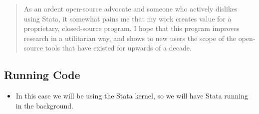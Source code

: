 \documentclass[10pt,parskip=half,
	toc=sectionentrywithdots,
	bibliography=totocnumbered,
	captions=tableheading,numbers=noendperiod]{scrartcl}
\providecommand{\tightlist}{%
  \setlength{\itemsep}{0pt}\setlength{\parskip}{0pt}}
\begin{document}
\begin{quote}
As an ardent open-source advocate and someone who actively dislikes
using Stata, it somewhat pains me that my work creates value for a
proprietary, closed-source program. I hope that this program improves
research in a utilitarian way, and shows to new users the scope of the
open-source tools that have existed for upwards of a decade.
\end{quote}

\hypertarget{running-code}{%
\subsection{Running Code}\label{running-code}}

\begin{itemize}
\tightlist
\item
  In this case we will be using the Stata kernel, so we will have Stata
  running in the background.
\end{itemize}
\end{document}
